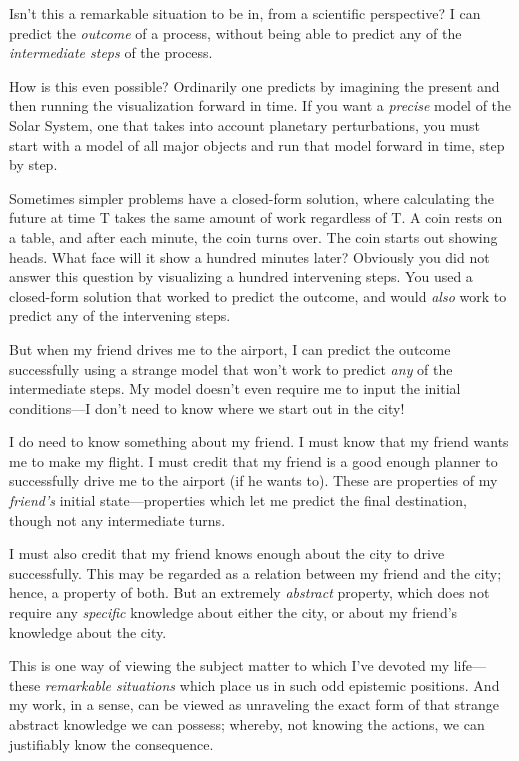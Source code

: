 {
 Isn't this a remarkable situation to be in, from a
scientific perspective? I can predict the \textit{outcome} of a
process, without being able to predict any of the \textit{intermediate
steps} of the process.}

{
 How is this even possible? Ordinarily one predicts by imagining
the present and then running the visualization forward in time. If you
want a \textit{precise} model of the Solar System, one that takes into
account planetary perturbations, you must start with a model of all
major objects and run that model forward in time, step by step.}

{
 Sometimes simpler problems have a closed-form solution, where
calculating the future at time T takes the same amount of work
regardless of T. A coin rests on a table, and after each minute, the
coin turns over. The coin starts out showing heads. What face will it
show a hundred minutes later? Obviously you did not answer this
question by visualizing a hundred intervening steps. You used a
closed-form solution that worked to predict the outcome, and would
\textit{also} work to predict any of the intervening steps.}

{
 But when my friend drives me to the airport, I can predict the
outcome successfully using a strange model that won't
work to predict \textit{any} of the intermediate steps. My model
doesn't even require me to input the initial
conditions---I don't need to know where we start out in
the city!}

{
 I do need to know something about my friend. I must know that my
friend wants me to make my flight. I must credit that my friend is a
good enough planner to successfully drive me to the airport (if he
wants to). These are properties of my \textit{friend's}
initial state---properties which let me predict the final destination,
though not any intermediate turns.}

{
 I must also credit that my friend knows enough about the city to
drive successfully. This may be regarded as a relation between my
friend and the city; hence, a property of both. But an extremely
\textit{abstract} property, which does not require any
\textit{specific} knowledge about either the city, or about my
friend's knowledge about the city.}

{
 This is one way of viewing the subject matter to which
I've devoted my life---these \textit{remarkable
situations} which place us in such odd epistemic positions. And my
work, in a sense, can be viewed as unraveling the exact form of that
strange abstract knowledge we can possess; whereby, not knowing the
actions, we can justifiably know the consequence.}

